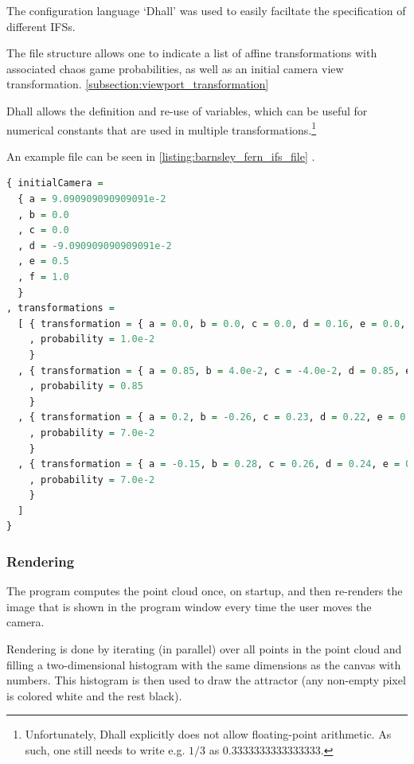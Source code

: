 \documentclass[11pt]{article}
\begin{document}
The configuration language `Dhall' \cite{gonzalez2019} was used to 
easily faciltate the specification of different IFSs.

The file structure allows one to indicate a list of affine transformations with associated chaos game probabilities,
as well as an initial camera view transformation. \autoref{subsection:viewport_transformation}

Dhall allows the definition and re-use of variables, which can be useful
for numerical constants that are used in multiple transformations.\footnote{Unfortunately, Dhall explicitly does not allow floating-point arithmetic.
As such, one still needs to write e.g. \(1/3\) as \(0.3333333333333333\).}

An example file can be seen in \autoref{listing:barnsley_fern_ifs_file} .


\begin{lstlisting}[float, language=Haskell, frame=single, breaklines=true, basicstyle=\scriptsize\tt, captionpos=b, caption={barnsley\_fern.ifs, representing \autoref{ifs:barnsley_fern}}, label={listing:barnsley_fern_ifs_file}]
{ initialCamera =
  { a = 9.090909090909091e-2
  , b = 0.0
  , c = 0.0
  , d = -9.090909090909091e-2
  , e = 0.5
  , f = 1.0
  }
, transformations =
  [ { transformation = { a = 0.0, b = 0.0, c = 0.0, d = 0.16, e = 0.0, f = 0.0 }
    , probability = 1.0e-2
    }
  , { transformation = { a = 0.85, b = 4.0e-2, c = -4.0e-2, d = 0.85, e = 0.0, f = 1.6 }
    , probability = 0.85
    }
  , { transformation = { a = 0.2, b = -0.26, c = 0.23, d = 0.22, e = 0.0, f = 1.6 }
    , probability = 7.0e-2
    }
  , { transformation = { a = -0.15, b = 0.28, c = 0.26, d = 0.24, e = 0.0, f = 0.44 }
    , probability = 7.0e-2
    }
  ]
}

\end{lstlisting}

\subsubsection{Rendering}
\label{sec:org101ebe0}
The program computes the point cloud once, on startup, and then re-renders the image that is shown in the program window
every time the user moves the camera.

Rendering is done by iterating (in parallel) over all points in the point cloud and filling a two-dimensional histogram with the same dimensions
as the canvas with numbers. 
This histogram is then used to draw the attractor (any non-empty pixel is colored white and the rest black).
\end{document}
